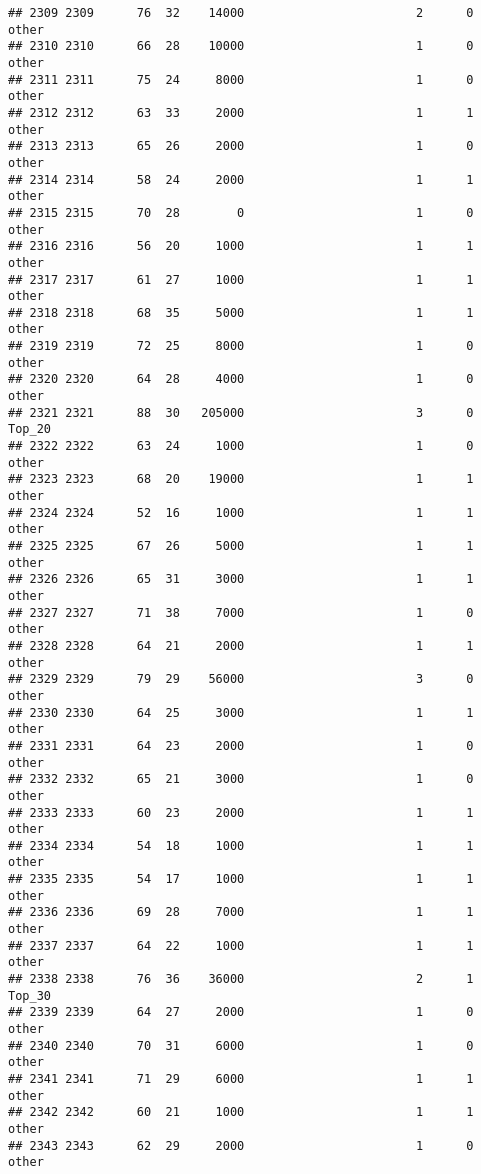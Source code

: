 \documentclass[
]{article}
\begin{document}
\begin{verbatim}
## 2309 2309      76  32    14000                        2      0    other
## 2310 2310      66  28    10000                        1      0    other
## 2311 2311      75  24     8000                        1      0    other
## 2312 2312      63  33     2000                        1      1    other
## 2313 2313      65  26     2000                        1      0    other
## 2314 2314      58  24     2000                        1      1    other
## 2315 2315      70  28        0                        1      0    other
## 2316 2316      56  20     1000                        1      1    other
## 2317 2317      61  27     1000                        1      1    other
## 2318 2318      68  35     5000                        1      1    other
## 2319 2319      72  25     8000                        1      0    other
## 2320 2320      64  28     4000                        1      0    other
## 2321 2321      88  30   205000                        3      0   Top_20
## 2322 2322      63  24     1000                        1      0    other
## 2323 2323      68  20    19000                        1      1    other
## 2324 2324      52  16     1000                        1      1    other
## 2325 2325      67  26     5000                        1      1    other
## 2326 2326      65  31     3000                        1      1    other
## 2327 2327      71  38     7000                        1      0    other
## 2328 2328      64  21     2000                        1      1    other
## 2329 2329      79  29    56000                        3      0    other
## 2330 2330      64  25     3000                        1      1    other
## 2331 2331      64  23     2000                        1      0    other
## 2332 2332      65  21     3000                        1      0    other
## 2333 2333      60  23     2000                        1      1    other
## 2334 2334      54  18     1000                        1      1    other
## 2335 2335      54  17     1000                        1      1    other
## 2336 2336      69  28     7000                        1      1    other
## 2337 2337      64  22     1000                        1      1    other
## 2338 2338      76  36    36000                        2      1   Top_30
## 2339 2339      64  27     2000                        1      0    other
## 2340 2340      70  31     6000                        1      0    other
## 2341 2341      71  29     6000                        1      1    other
## 2342 2342      60  21     1000                        1      1    other
## 2343 2343      62  29     2000                        1      0    other

\end{verbatim}
\end{document}
